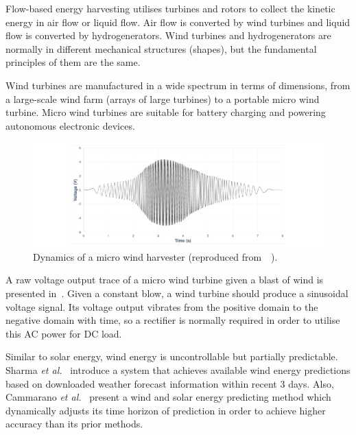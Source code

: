 Flow-based energy harvesting utilises turbines and rotors to collect the kinetic energy in air flow or liquid flow. Air flow is converted by wind turbines and liquid flow is converted by hydrogenerators. Wind turbines and hydrogenerators are normally in different mechanical structures (shapes), but the fundamental principles of them are the same.

Wind turbines are manufactured in a wide spectrum in terms of dimensions, from a large-scale wind farm (arrays of large turbines) to a portable micro wind turbine. Micro wind turbines are suitable for battery charging and powering autonomous electronic devices. 

\begin{figure}
    \centering
    \includegraphics[width=\columnwidth]{ch2_review/figures/micro_wind_turbine}
\caption[Dynamics of a micro wind harvester.]{Dynamics of a micro wind harvester (reproduced from~\cite{balsamo2016graceful}~).}
    \label{Figure:micro_wind_turbine}
\end{figure}

A raw voltage output trace of a micro wind turbine given a blast of wind is presented in~. Given a constant blow, a wind turbine should produce a sinusoidal voltage signal. Its voltage output vibrates from the positive domain to the negative domain with time, so a rectifier is normally required in order to utilise this AC power for DC load.

Similar to solar energy, wind energy is uncontrollable but partially predictable. Sharma \textit{et al.}~\cite{sharma2010cloudy} introduce a system that achieves available wind energy predictions based on downloaded weather forecast information within recent 3 days. Also, Cammarano \textit{et al.}~\cite{cammarano2012pro} present a wind and solar energy predicting method which dynamically adjusts its time horizon of prediction in order to achieve higher accuracy than its prior methods. 

